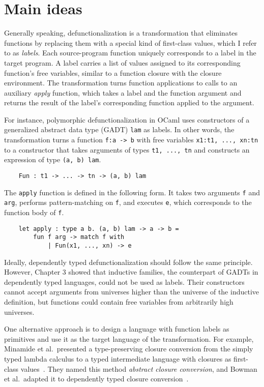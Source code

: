
\section{Main ideas}

Generally speaking, defunctionalization is a transformation that eliminates functions by replacing them with a special kind of first-class values, which I refer to as \textit{labels}. Each source-program function uniquely corresponds to a label in the target program. 
A label carries a list of values assigned to its corresponding function's free variables, similar to a function closure with the closure environment. 
The transformation turns function applications to calls to an auxiliary \textit{apply} function, which takes a label and the function argument and returns the result of the label's corresponding function applied to the argument.

For instance, polymorphic defunctionalization in OCaml uses constructors of a generalized abstract data type (GADT) \texttt{lam} as labels.
In other words, the transformation turns a function \texttt{f:a -> b} with free variables \texttt{x1:t1, ..., xn:tn} to a constructor that takes arguments of types \texttt{t1, ..., tn} and constructs an expression of type \texttt{(a, b) lam}.
\begin{lstlisting}
	Fun : t1 -> ... -> tn -> (a, b) lam
\end{lstlisting}
The \texttt{apply} function is defined in the following form. It takes two arguments \texttt{f} and \texttt{arg}, performs pattern-matching on \texttt{f}, and executes \texttt{e}, which corresponds to the function body of \texttt{f}.
\begin{lstlisting}
	let apply : type a b. (a, b) lam -> a -> b =
	    fun f arg -> match f with
	    	| Fun(x1, ..., xn) -> e
\end{lstlisting}

Ideally, dependently typed defunctionalization should follow the same principle. However, Chapter 3 showed that inductive families, the counterpart of GADTs in dependently typed languages, could not be used as labels. Their constructors cannot accept arguments from universes higher than the universe of the inductive definition, but functions could contain free variables from arbitrarily high universes.

One alternative approach is to design a language with function labels as primitives and use it as the target language of the transformation. 
For example, Minamide et al.~presented a type-preserving closure conversion from the simply typed lambda calculus to a typed intermediate language with closures as first-class values~\cite{DBLP:conf/popl/MinamideMH96}. They named this method \textit{abstract closure conversion}, and Bowman et al.~adapted it to dependently typed closure conversion~\cite{DBLP:conf/pldi/BowmanA18}. 

